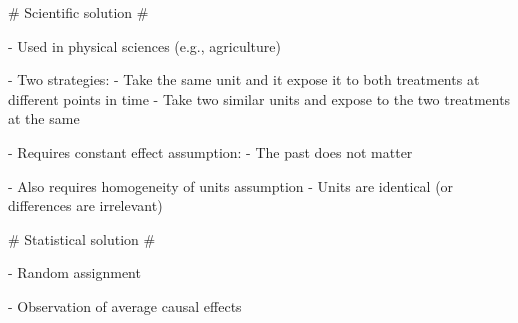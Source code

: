 
# Scientific solution #

 - Used in physical sciences (e.g., agriculture)

 - Two strategies: 
   - Take the same unit and it expose it to both treatments at different points in time
   - Take two similar units and expose to the two treatments at the same

 - Requires constant effect assumption:
   - The past does not matter

 - Also requires homogeneity of units assumption
   - Units are identical (or differences are irrelevant)

# Statistical solution #

 - Random assignment

 - Observation of average causal effects
 





\appendix
\frame{}


